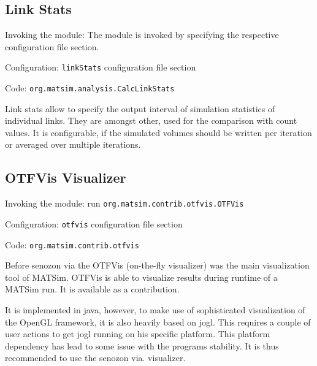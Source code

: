 \subsection{Link Stats}
\label{sec:linkStats}
\begin{compactitem}
\item Invoking the module: The module is invoked by specifying the respective configuration file section.
\item Configuration: \lstinline|linkStats| configuration file section
\item Code: \lstinline|org.matsim.analysis.CalcLinkStats|
\end{compactitem}

Link stats allow to specify the output interval of simulation statistics of individual links. They are amongst other, used for the comparison with count values. It is configurable, if the simulated volumes should be written per iteration or averaged over multiple iterations.

\subsection{OTFVis Visualizer}
\label{sec:OTFVis}
\begin{compactitem}
\item Invoking the module: run \lstinline|org.matsim.contrib.otfvis.OTFVis|
\item Configuration: \lstinline|otfvis| configuration file section
\item Code: \lstinline|org.matsim.contrib.otfvis|
\end{compactitem}

Before senozon via the OTFVis (on-the-fly visualizer) \citep[][]{Strippgen_PhDThesis_2009} was the main visualization tool of MATSim. OTFVis is able to visualize results during runtime of a MATSim run. It is available as a contribution.

It is implemented in java, however, to make use of sophisticated visualization of the OpenGL framework, it is also heavily based on jogl. This requires a couple of user actions to get jogl running on his specific platform. This platform dependency has lead to some issue with the programs stability. It is thus recommended to use the senozon via. visualizer.
